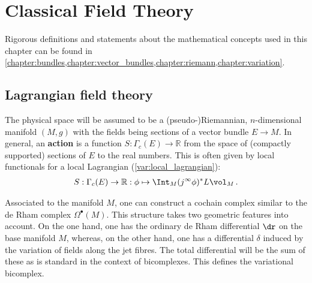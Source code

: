 \chapter{Classical Field Theory}\label{chapter:classical_fields}

    Rigorous definitions and statements about the mathematical concepts used in this chapter can be found in \cref{chapter:bundles,chapter:vector_bundles,chapter:riemann,chapter:variation}.

    \minitoc

\section{Lagrangian field theory}

    The physical space will be assumed to be a (pseudo-)Riemannian, $n$-dimensional manifold $(M,g)$ with the fields being sections of a vector bundle $E\rightarrow M$. In general, an \textbf{action} is a function $S:\Gamma_c(E)\rightarrow\mathbb{R}$ from the space of (compactly supported) sections of $E$ to the real numbers. This is often given by local functionals for a local Lagrangian (\cref{var:local_lagrangian}):
    \begin{gather}
        S:\Gamma_c(E)\rightarrow\mathbb{R}:\phi\mapsto\Int_M(j^\infty\phi)^*L\vol_M\,.
    \end{gather}

    Associated to the manifold $M$, one can construct a cochain complex similar to the de Rham complex $\Omega^\bullet(M)$. This structure takes two geometric features into account. On the one hand, one has the ordinary de Rham differential $\dr$ on the base manifold $M$, whereas, on the other hand, one has a differential $\delta$ induced by the variation of fields along the jet fibres. The total differential will be the sum of these as is standard in the context of bicomplexes. This defines the variational bicomplex.

